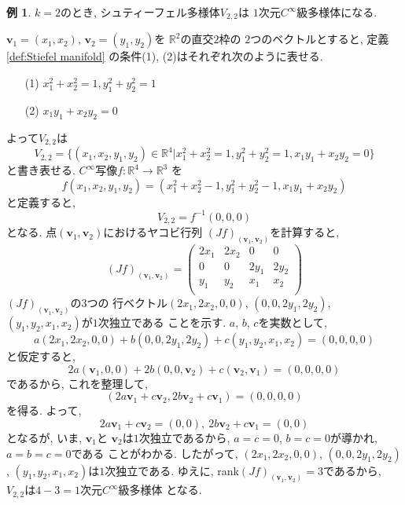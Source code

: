 \documentclass[a4j,12pt]{jarticle}
\theoremstyle{definition}
\newtheorem{example}[theorem]{例}
\begin{document}
\begin{example}
    $k=2$のとき, 
    シュティーフェル多様体$V_{2,2}$は
    $1$次元$C^\infty$級多様体になる. 

    $\boldsymbol{v}_1=(x_1,x_2)$, 
    $\boldsymbol{v}_2=(y_1,y_2)$を
    $\mathbb{R}^2$の直交$2$枠の
    $2$つのベクトルとすると, 定義\ref{def:Stiefel manifold}
    の条件(1), (2)はそれぞれ次のように表せる. 
    \begin{itemize}
        \item[(1)]
        $x_1^2+x_2^2=1, y_1^2+y_2^2=1$
        \item[(2)]
        $x_1y_1+x_2y_2=0$
    \end{itemize}
    よって$V_{2,2}$は
    $$V_{2,2}=\{(x_1,x_2,y_1,y_2)\in \mathbb{R}^4|
    x_1^2+x_2^2=1, y_1^2+y_2^2=1, x_1y_1+x_2y_2=0\}$$
    と書き表せる. 
    $C^\infty$写像$f:\mathbb{R}^4\to \mathbb{R}^3$
    を
    $$f(x_1,x_2,y_1,y_2)=
    (x_1^2+x_2^2-1, y_1^2+y_2^2-1, x_1y_1+x_2y_2)$$
    と定義すると, 
    $$V_{2,2}=f^{-1}(0,0,0)$$
    となる. 点$(\boldsymbol{v}_1,
    \boldsymbol{v}_2)$におけるヤコビ行列
    $(Jf)_{(\boldsymbol{v}_1,
    \boldsymbol{v}_2)}$を計算すると, 
    $$(Jf)_{(\boldsymbol{v}_1,
    \boldsymbol{v}_2)}=
    \left(\begin{array}{cccc}
        2x_1&2x_2&0&0\\
        0&0&2y_1&2y_2\\
        y_1&y_2&x_1&x_2\\
    \end{array}\right)$$
    $(Jf)_{(\boldsymbol{v}_1,
    \boldsymbol{v}_2)}$の$3$つの
    行ベクトル$(2x_1,2x_2,0,0)$, 
    $(0,0,2y_1,2y_2)$, 
    $(y_1,y_2,x_1,x_2)$が$1$次独立である
    ことを示す. $a$, $b$, $c$を実数として, 
    $$a(2x_1,2x_2,0,0)+b(0,0,2y_1,2y_2)+
    c(y_1,y_2,x_1,x_2)=(0,0,0,0)$$
    と仮定すると, 
    $$2a(\boldsymbol{v}_1,0,0)+
    2b(0,0,\boldsymbol{v}_2)+
    c(\boldsymbol{v}_2,\boldsymbol{v}_1)=
    (0,0,0,0)$$
    であるから, これを整理して, 
    $$(2a\boldsymbol{v}_1+c\boldsymbol{v}_2,
    2b\boldsymbol{v}_2+c\boldsymbol{v}_1)=
    (0,0,0,0)$$
    を得る. よって, 
    $$2a\boldsymbol{v}_1+c\boldsymbol{v}_2=
    (0,0),\ 
    2b\boldsymbol{v}_2+c\boldsymbol{v}_1=
    (0,0)$$
    となるが, いま, $\boldsymbol{v}_1$と
    $\boldsymbol{v}_2$は$1$次独立であるから, 
    $a=c=0$, $b=c=0$が導かれ, $a=b=c=0$である
    ことがわかる. したがって, $(2x_1,2x_2,0,0)$, 
    $(0,0,2y_1,2y_2)$, 
    $(y_1,y_2,x_1,x_2)$は$1$次独立である. 
    ゆえに, rank$(Jf)_{(\boldsymbol{v}_1,
    \boldsymbol{v}_2)}=3$であるから, 
    $V_{2,2}$は$4-3=1$次元$C^\infty$級多様体
    となる. 
\end{example}
\newpage
%
\end{document}
